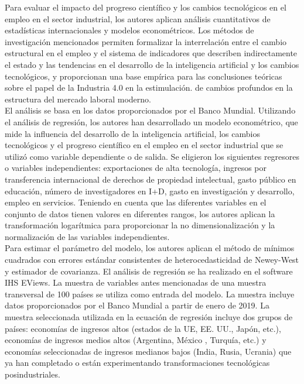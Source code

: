 Para evaluar el impacto del progreso científico y los cambios tecnológicos en el empleo en el sector industrial, los autores aplican análisis cuantitativos de estadísticas internacionales y modelos econométricos. Los métodos de investigación mencionados permiten formalizar la interrelación entre el cambio estructural en el empleo y el sistema de indicadores que describen indirectamente el estado y las tendencias en el desarrollo de la inteligencia artificial y los cambios tecnológicos, y proporcionan una base empírica para las conclusiones teóricas sobre el papel de la Industria 4.0 en la estimulación. de cambios profundos en la estructura del mercado laboral moderno.\\

El análisis se basa en los datos proporcionados por el Banco Mundial. Utilizando el análisis de regresión, los autores han desarrollado un modelo econométrico, que mide la influencia del desarrollo de la inteligencia artificial, los cambios tecnológicos y el progreso científico en el empleo en el sector industrial que se utilizó como variable dependiente o de salida. Se eligieron los siguientes regresores o variables independientes: exportaciones de alta tecnología, ingresos por transferencia internacional de derechos de propiedad intelectual, gasto público en educación, número de investigadores en I+D, gasto en investigación y desarrollo, empleo en servicios. Teniendo en cuenta que las diferentes variables en el conjunto de datos tienen valores en diferentes rangos, los autores aplican la transformación logarítmica para proporcionar la no dimensionalización y la normalización de las variables independientes.\\

Para estimar el parámetro del modelo, los autores aplican el método de mínimos cuadrados con errores estándar consistentes de heterocedasticidad de Newey-West y estimador de covarianza. El análisis de regresión se ha realizado en el software IHS EViews. La muestra de variables antes mencionadas de una muestra transversal de 100 países se utiliza como entrada del modelo. La muestra incluye datos proporcionados por el Banco Mundial a partir de enero de 2019. La muestra seleccionada utilizada en la ecuación de regresión incluye dos grupos de países: economías de ingresos altos (estados de la UE, EE. UU., Japón, etc.), economías de ingresos medios altos (Argentina, México , Turquía, etc.) y economías seleccionadas de ingresos medianos bajos (India, Rusia, Ucrania) que ya han completado o están experimentando transformaciones tecnológicas posindustriales.\\

